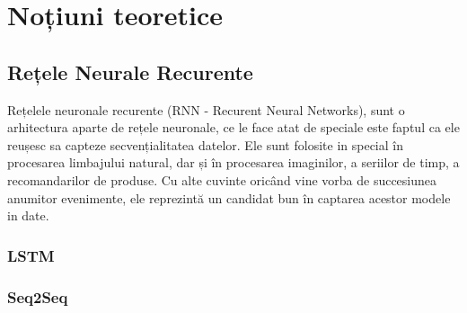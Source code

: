 \chapter{Noțiuni teoretice}

\section{Rețele Neurale Recurente}

Rețelele neuronale recurente (RNN - Recurent Neural Networks), sunt o arhitectura aparte de rețele neuronale, ce le face atat de speciale este faptul ca ele reușesc sa capteze secvențialitatea datelor. Ele sunt folosite in special în procesarea limbajului natural, dar și în procesarea imaginilor, a seriilor de timp, a recomandarilor de produse. Cu alte cuvinte oricând vine vorba de succesiunea anumitor evenimente, ele reprezintă un candidat bun în captarea acestor modele in date.

\subsection{LSTM}

\subsection{Seq2Seq}